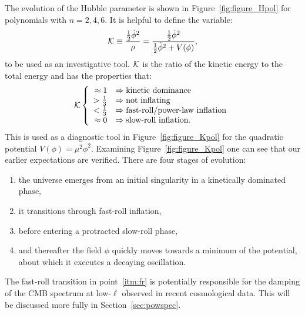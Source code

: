 The evolution of the Hubble parameter is shown in Figure~\ref{fig:figure_Hpol} for polynomials with \(n=2,4,6\). It is helpful to define the variable:
\begin{equation}
  \mathcal{K} 
  \equiv  
  \frac{\frac{1}{2}\dot{\phi}^2  }{\rho}  
  =  
  \frac{\frac{1}{2}\dot{\phi}^2  }
  {\frac{1}{2}\dot{\phi}^2 + V(\phi)},
\end{equation}
to be used as an investigative tool. \(\mathcal{K}\) is the ratio of the kinetic energy to the total energy and has the properties that:
\begin{equation}
  \mathcal{K} 
    \left\{
    \begin{array}{rl}
      \approx 1 &\Rightarrow \hbox{kinetic dominance} 
      \\
      >\frac{1}{3} &\Rightarrow \hbox{not inflating}
      \\
      <\frac{1}{3} &\Rightarrow \hbox{fast-roll/power-law inflation}
      \\
      \approx 0 &\Rightarrow \hbox{slow-roll inflation.}
    \end{array}
    \right.
\end{equation}
This is used as a diagnostic tool in Figure~\ref{fig:figure_Kpol} for the quadratic potential \(V(\phi) = \mu^2\phi^2\). Examining Figure~\ref{fig:figure_Kpol} one can see that our earlier expectations are verified. There are four stages of evolution:
\begin{enumerate}
  \item the universe emerges from an initial singularity in a
    kinetically dominated phase,
  \item it transitions through fast-roll inflation,\label{itm:fr}
  \item before entering a protracted slow-roll phase, 
  \item and thereafter the field \(\phi\) quickly moves towards a minimum of the potential, about which it executes a decaying oscillation.
\end{enumerate}
The fast-roll transition in point~\eqref{itm:fr} is potentially responsible for the damping of the CMB spectrum at low-\(\ell\) observed in recent cosmological data. This will be discussed more fully in Section~\ref{sec:powspec}.



